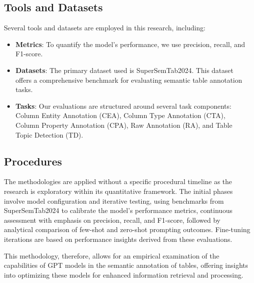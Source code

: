 \documentclass{article}
\begin{document}
\subsection{Tools and Datasets}
Several tools and datasets are employed in this research, including:

\begin{itemize}
    \item \textbf{Metrics}: To quantify the model's performance, we use precision, recall, and F1-score.
    \item \textbf{Datasets}: The primary dataset used is SuperSemTab2024. This dataset offers a comprehensive benchmark for evaluating semantic table annotation tasks.
    \item \textbf{Tasks}: Our evaluations are structured around several task components: Column Entity Annotation (CEA), Column Type Annotation (CTA), Column Property Annotation (CPA), Raw Annotation (RA), and Table Topic Detection (TD).
\end{itemize}

\subsection{Procedures}
The methodologies are applied without a specific procedural timeline as the research is exploratory within its quantitative framework. The initial phases involve model configuration and iterative testing, using benchmarks from SuperSemTab2024 to calibrate the model's performance metrics, continuous assessment with emphasis on precision, recall, and F1-score, followed by analytical comparison of few-shot and zero-shot prompting outcomes. Fine-tuning iterations are based on performance insights derived from these evaluations.

This methodology, therefore, allows for an empirical examination of the capabilities of GPT models in the semantic annotation of tables, offering insights into optimizing these models for enhanced information retrieval and processing.
\end{document}
